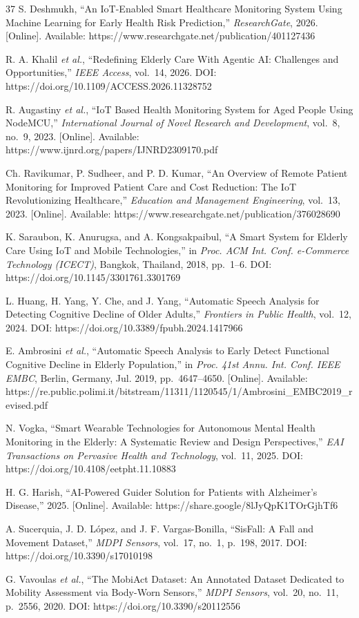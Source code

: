\documentclass[conference]{IEEEtran}
\begin{document}
\begin{thebibliography}{37}
S. Deshmukh, ``An IoT-Enabled Smart Healthcare Monitoring System Using Machine Learning for Early Health Risk Prediction,'' \textit{ResearchGate}, 2026. [Online]. Available: https://www.researchgate.net/publication/401127436

R. A. Khalil \textit{et al.}, ``Redefining Elderly Care With Agentic AI: Challenges and Opportunities,'' \textit{IEEE Access}, vol.~14, 2026. DOI: https://doi.org/10.1109/ACCESS.2026.11328752

R. Augastiny \textit{et al.}, ``IoT Based Health Monitoring System for Aged People Using NodeMCU,'' \textit{International Journal of Novel Research and Development}, vol.~8, no.~9, 2023. [Online]. Available: https://www.ijnrd.org/papers/IJNRD2309170.pdf

Ch. Ravikumar, P. Sudheer, and P. D. Kumar, ``An Overview of Remote Patient Monitoring for Improved Patient Care and Cost Reduction: The IoT Revolutionizing Healthcare,'' \textit{Education and Management Engineering}, vol.~13, 2023. [Online]. Available: https://www.researchgate.net/publication/376028690

K. Saraubon, K. Anurugsa, and A. Kongsakpaibul, ``A Smart System for Elderly Care Using IoT and Mobile Technologies,'' in \textit{Proc. ACM Int. Conf. e-Commerce Technology (ICECT)}, Bangkok, Thailand, 2018, pp.~1--6. DOI: https://doi.org/10.1145/3301761.3301769

L. Huang, H. Yang, Y. Che, and J. Yang, ``Automatic Speech Analysis for Detecting Cognitive Decline of Older Adults,'' \textit{Frontiers in Public Health}, vol.~12, 2024. DOI: https://doi.org/10.3389/fpubh.2024.1417966

E. Ambrosini \textit{et al.}, ``Automatic Speech Analysis to Early Detect Functional Cognitive Decline in Elderly Population,'' in \textit{Proc. 41st Annu. Int. Conf. IEEE EMBC}, Berlin, Germany, Jul. 2019, pp.~4647--4650. [Online]. Available: https://re.public.polimi.it/bitstream/11311/1120545/1/Ambrosini\_EMBC2019\_revised.pdf

N. Vogka, ``Smart Wearable Technologies for Autonomous Mental Health Monitoring in the Elderly: A Systematic Review and Design Perspectives,'' \textit{EAI Transactions on Pervasive Health and Technology}, vol.~11, 2025. DOI: https://doi.org/10.4108/eetpht.11.10883

H. G. Harish, ``AI-Powered Guider Solution for Patients with Alzheimer's Disease,'' 2025. [Online]. Available: https://share.google/8lJyQpK1TOrGjhTf6

A. Sucerquia, J. D. L\'{o}pez, and J. F. Vargas-Bonilla, ``SisFall: A Fall and Movement Dataset,'' \textit{MDPI Sensors}, vol.~17, no.~1, p.~198, 2017. DOI: https://doi.org/10.3390/s17010198

G. Vavoulas \textit{et al.}, ``The MobiAct Dataset: An Annotated Dataset Dedicated to Mobility Assessment via Body-Worn Sensors,'' \textit{MDPI Sensors}, vol.~20, no.~11, p.~2556, 2020. DOI: https://doi.org/10.3390/s20112556

\end{thebibliography}
\end{document}
